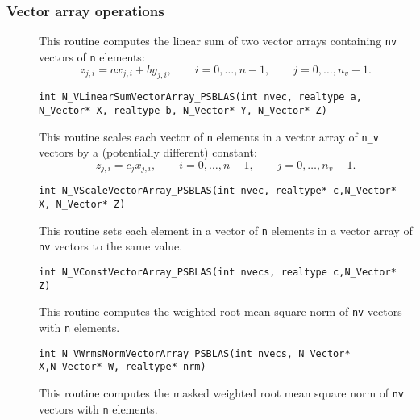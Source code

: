 \documentclass[twoside,a4paper]{refart}
\begin{document}
	\subsubsection{Vector array operations}
 \begin{description}
 	\item[] This routine computes the linear sum of two vector arrays
 	containing \lstinline[style=CStyle]|nv| vectors of \lstinline[style=CStyle]|n| elements:
 	\begin{equation*}
 		z_{j,i} = a x_{j,i} + b y_{j,i}, \qquad i=0,\ldots,n-1, \qquad j=0,\ldots,n_v -1.
 	\end{equation*}
 	
 	 \lstinline[style=CStyle]|int N_VLinearSumVectorArray_PSBLAS(int nvec, realtype a, N_Vector* X, realtype b, N_Vector* Y, N_Vector* Z)|
 	
 	\item[] This routine scales each vector of \lstinline[style=CStyle]|n| elements in a vector
 	array of \lstinline[style=CStyle]|n_v| vectors by a (potentially different) constant:
 	\begin{equation*}
 		z_{j,i} = c_j x_{j,i}, \qquad i=0,\ldots,n-1, \qquad j=0,\ldots,n_v-1.
 	\end{equation*}
 	
 	 \lstinline[style=CStyle]|int N_VScaleVectorArray_PSBLAS(int nvec, realtype* c,N_Vector* X, N_Vector* Z)|
 	
 	\item[] This routine sets each element in a vector of \lstinline[style=CStyle]|n|  elements in a vector array of \lstinline[style=CStyle]|nv|  vectors to the same value.
 	
 	 \lstinline[style=CStyle]|int N_VConstVectorArray_PSBLAS(int nvecs, realtype c,N_Vector* Z)|
 	
 	\item[] This routine computes the weighted root mean square
 	norm of \lstinline[style=CStyle]|nv| vectors with \lstinline[style=CStyle]|n| elements.
 	
 	 \lstinline[style=CStyle]|int N_VWrmsNormVectorArray_PSBLAS(int nvecs, N_Vector* X,N_Vector* W, realtype* nrm)|
 	
 	\item[] This routine computes the masked weighted root mean square norm of \lstinline[style=CStyle]|nv| vectors with \lstinline[style=CStyle]|n| elements.
 	

\end{description}
\end{document}
